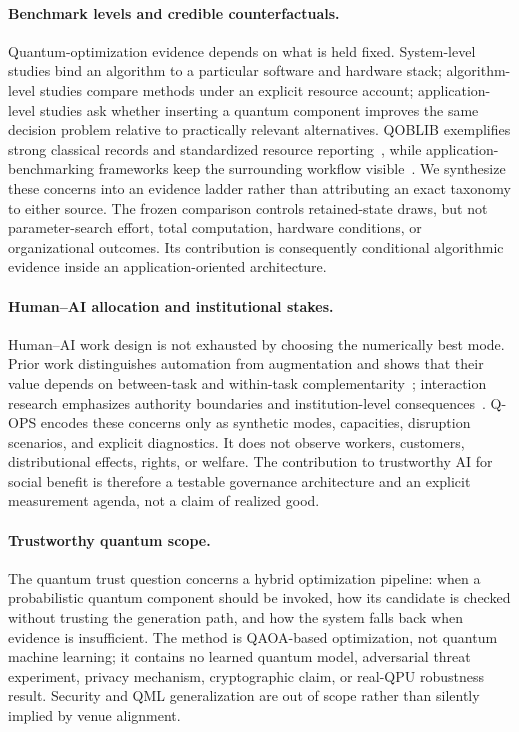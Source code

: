 \paragraph{Benchmark levels and credible counterfactuals.}
Quantum-optimization evidence depends on what is held fixed. System-level studies bind an algorithm to a particular software and hardware stack; algorithm-level studies compare methods under an explicit resource account; application-level studies ask whether inserting a quantum component improves the same decision problem relative to practically relevant alternatives. QOBLIB exemplifies strong classical records and standardized resource reporting~\citep{koch2026qoblib}, while application-benchmarking frameworks keep the surrounding workflow visible~\citep{finzgar2022quark}. We synthesize these concerns into an evidence ladder rather than attributing an exact taxonomy to either source. The frozen comparison controls retained-state draws, but not parameter-search effort, total computation, hardware conditions, or organizational outcomes. Its contribution is consequently conditional algorithmic evidence inside an application-oriented architecture.

\paragraph{Human--AI allocation and institutional stakes.}
Human--AI work design is not exhausted by choosing the numerically best mode. Prior work distinguishes automation from augmentation and shows that their value depends on between-task and within-task complementarity~\citep{fuegener2026complementarity}; interaction research emphasizes authority boundaries and institution-level consequences~\citep{amershi2019humanai,seeber2020machines}. Q-OPS encodes these concerns only as synthetic modes, capacities, disruption scenarios, and explicit diagnostics. It does not observe workers, customers, distributional effects, rights, or welfare. The contribution to trustworthy AI for social benefit is therefore a testable governance architecture and an explicit measurement agenda, not a claim of realized good.

\paragraph{Trustworthy quantum scope.}
The quantum trust question concerns a hybrid optimization pipeline: when a probabilistic quantum component should be invoked, how its candidate is checked without trusting the generation path, and how the system falls back when evidence is insufficient. The method is QAOA-based optimization, not quantum machine learning; it contains no learned quantum model, adversarial threat experiment, privacy mechanism, cryptographic claim, or real-QPU robustness result. Security and QML generalization are out of scope rather than silently implied by venue alignment.

